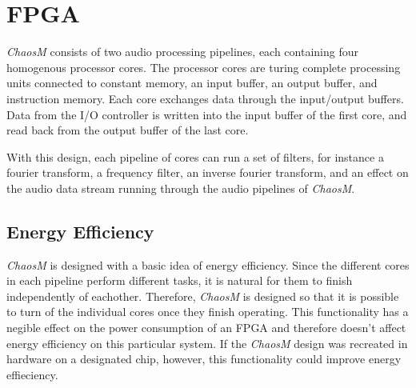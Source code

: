 \FloatBarrier
\section{FPGA}\label{chapter:fpga}

\textit{ChaosM} consists of two audio processing pipelines, each containing four
homogenous processor cores. The processor cores are turing complete processing
units connected to constant memory, an input buffer, an output buffer, and
instruction memory. Each core exchanges data through the input/output buffers.
Data from the I/O controller is written into the input buffer of the first core, and read
back from the output buffer of the last core.

With this design, each pipeline of cores can run a set of filters, for instance
a fourier transform, a frequency filter, an inverse fourier transform, and an
effect on the audio data stream running through the audio pipelines of \textit{ChaosM}.







\subsection{Energy Efficiency}

\textit{ChaosM} is designed with a basic idea of energy efficiency. Since the different cores
in each pipeline perform different tasks, it is natural for them to finish independently of 
eachother. Therefore, \textit{ChaosM} is designed so that it is possible to turn of the individual 
cores once they finish operating. This functionality has a negible effect on the power consumption
of an FPGA and therefore doesn't affect energy efficiency on this particular system. If the
\textit{ChaosM} design was recreated in hardware on a designated chip, however, this functionality
could improve energy effieciency.

